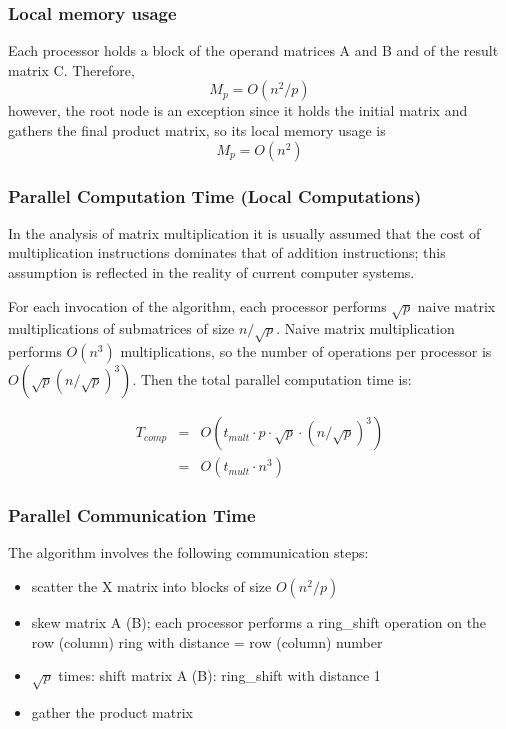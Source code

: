 \documentclass{article}
\begin{document}
\subsubsection{Local memory usage}

Each processor holds a block of the operand matrices A and B and of the result
matrix C. Therefore, $$M_p = O(n^2/p)$$ however, the root node is an exception
since it holds the initial matrix and gathers the final product matrix, so its
local memory usage is $$M_p = O(n^2)$$

\subsubsection{Parallel Computation Time (Local Computations)}

In the analysis of matrix multiplication it is usually assumed that the cost of
multiplication instructions dominates that of addition instructions; this
assumption is reflected in the reality of current computer systems.

For each invocation of the algorithm, each processor performs $\sqrt{p}$ naive
matrix multiplications of submatrices of size $n/\sqrt{p}$. Naive matrix
multiplication performs $O(n^3)$ multiplications, so the number of operations
per processor is $O(\sqrt{p}(n/\sqrt{p})^3)$. Then the total parallel
computation time is: 

\begin{eqnarray*}
T_{{comp}} 	&=& O(t_{{mult}} \cdot p \cdot \sqrt{p} \cdot (n/\sqrt{p})^3) \\ 
			&=& O(t_{{mult}} \cdot n^3)
\end{eqnarray*}

\subsubsection{Parallel Communication Time}

The algorithm involves the following communication steps:
\begin{itemize}
	\item scatter the X matrix into blocks of size $O(n^2/p)$
	\item skew matrix A (B); each processor performs a ring\_shift operation on
	the row (column) ring with distance = row (column) number
	\item $\sqrt{p}$ times: shift matrix A (B): ring\_shift with distance 1
	\item gather the product matrix
\end{itemize}
\end{document}

